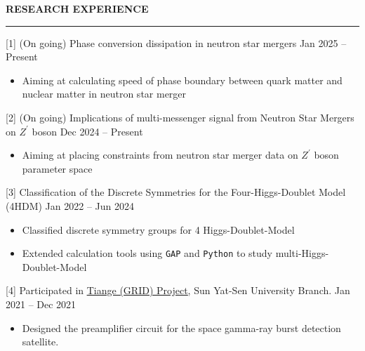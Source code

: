 \documentclass[11pt,letterpaper]{article}
\newcommand{\blue}{\color{blue}}
\begin{document}
\textbf{\MakeUppercase{Research Experience}}
\vspace{0.5em}
\hrule
\vspace{-0.3em}
[1] (On going) Phase conversion dissipation in neutron star mergers \hfill Jan 2025 {--} Present\\
\vspace{-1.8em}
\begin{itemize}
    \itemsep -5pt {}
    \item Aiming at calculating speed of phase boundary between quark matter and nuclear matter in neutron star merger
\end{itemize}

\vspace{0.4em}

[2] (On going) Implications of multi-messenger signal from Neutron Star Mergers on $Z^\prime$ boson \hfill Dec 2024 {--} Present\\
\vspace{-1.8em}
\begin{itemize}
    \itemsep -5pt {}
    \item Aiming at placing constraints from neutron star merger data on $Z^\prime$ boson parameter space
\end{itemize}

\vspace{0.4em}


[3] Classification of the Discrete Symmetries
for the Four-Higgs-Doublet Model (4HDM) \hfill Jan 2022 {--} Jun 2024 \\
\vspace{-1.8em}
\begin{itemize}
    \itemsep -5pt {}
    \item Classified discrete symmetry groups for 4 Higgs-Doublet-Model
    \item Extended calculation tools using {\tt GAP} and {\tt Python} to study multi-Higgs-Doublet-Model
\end{itemize}

\vspace{0.4em}

[4] Participated in \href{https://www.nssdc.ac.cn/nssdc_zh/html/task/GRID.html}{\underline{\blue Tiange (GRID) Project}}, Sun Yat-Sen University Branch. \hfill Jan 2021 {--} Dec 2021 \\
\vspace{-1.8em}
\begin{itemize}
    \itemsep -5pt {}
    \item Designed the preamplifier circuit for the space gamma-ray burst detection satellite.
\end{itemize}
\end{document}

